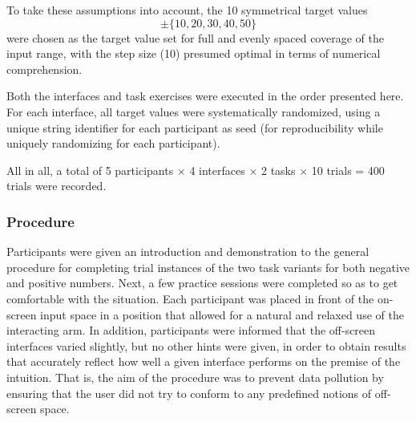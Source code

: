 To take these assumptions into account, the 10 symmetrical target values 
$$\pm\{10, 20, 30, 40, 50\}$$
were chosen as the target value set for full and evenly spaced coverage of the input range, with the step size (10) presumed optimal in terms of  numerical comprehension. 

Both the interfaces and task exercises were executed in the order presented here. For each interface, all target values were systematically randomized, using a unique string identifier for each participant as seed (for reproducibility while uniquely randomizing for each participant). 



All in all, a total of 5 participants $\times$ 4 interfaces $\times$ 2 tasks $\times$ 10 trials = 400 trials were recorded. %


\subsubsection{Procedure}

Participants were given an introduction and demonstration to the general procedure for completing trial instances of the two task variants for both negative and positive numbers. Next, a few practice sessions were completed so as to get comfortable with the situation. Each participant was placed in front of the on-screen input space in a position that allowed for a natural and relaxed use of the interacting arm. In addition, participants were informed that the off-screen interfaces varied slightly, but no other hints were given, in order to obtain results that accurately reflect how well a given interface performs on the premise of the  intuition. That is, the aim of the procedure was to prevent data pollution by ensuring that the user did not try to conform to any predefined notions of off-screen space. 




